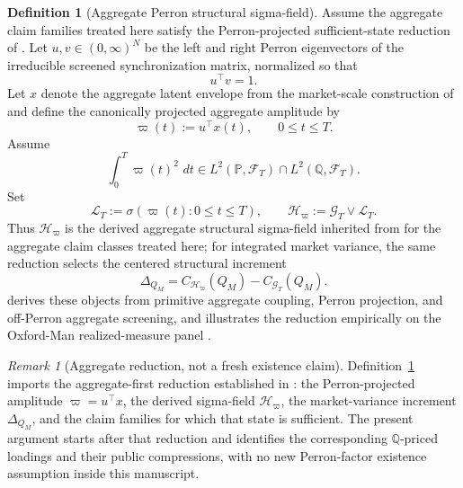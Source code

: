 \documentclass[11pt,a4paper]{amsart}
\theoremstyle{plain}
\theoremstyle{definition}
\newtheorem{definition}[theorem]{Definition}
\theoremstyle{remark}
\newtheorem{remark}[theorem]{Remark}
\newcommand{\PP}{\mathbb{P}}
\newcommand{\QQ}{\mathbb{Q}}
\newcommand{\cF}{\mathcal{F}}
\newcommand{\cG}{\mathcal{G}}
\newcommand{\cH}{\mathcal{H}}
\newcommand{\cL}{\mathcal{L}}
\newcommand{\dd}{\,d}
\begin{document}
\begin{definition}[Aggregate Perron structural sigma-field]\label{def:lambda-structure}
Assume the aggregate claim families treated here satisfy the Perron-projected
sufficient-state reduction of \cite{vidal2026market}.  Let \(u,v\in(0,\infty)^N\) be the left and
right Perron eigenvectors of the irreducible screened synchronization matrix, normalized so that
\[
        u^\top v=1.
\]
Let \(x\) denote the aggregate latent envelope from the market-scale construction of
\cite{vidal2026market} and define the
canonically projected aggregate amplitude by
\[
        \varpi(t):=u^\top x(t),
        \qquad
        0\le t\le T.
\]
Assume
\[
        \int_0^T \varpi(t)^2\,\dd t \in L^2(\PP,\cF_T)\cap L^2(\QQ,\cF_T).
\]
Set
\[
        \cL_T:=\sigma(\varpi(t):0\le t\le T),
        \qquad
        \cH_\varpi:=\cG_T\vee \cL_T.
\]
Thus \(\cH_\varpi\) is the derived aggregate structural sigma-field inherited from
\cite{vidal2026market} for the aggregate claim classes treated here; for integrated market
variance, the same reduction selects the centered structural increment
\[
        \Delta_{Q_M}
        =
        C_{\cH_\varpi}(Q_M)-C_{\cG_T}(Q_M).
\]
\cite{vidal2026market} derives these objects from primitive aggregate coupling, Perron projection,
and off-Perron aggregate screening, and illustrates the reduction empirically on the Oxford-Man
realized-measure panel \cite{heber2009realized,barndorffNielsen2008realized,shephardSheppard2010heavy}.
\end{definition}


\begin{remark}[Aggregate reduction, not a fresh existence claim]
Definition~\ref{def:lambda-structure} imports the aggregate-first reduction established in
\cite{vidal2026market}: the Perron-projected amplitude \(\varpi=u^\top x\), the derived sigma-field
\(\cH_\varpi\), the market-variance increment \(\Delta_{Q_M}\), and the claim families for which
that state is sufficient.  The present argument starts after that reduction and identifies the
corresponding \(\QQ\)-priced loadings and their public compressions, with no new Perron-factor
existence assumption inside this manuscript.
\end{remark}
\end{document}
